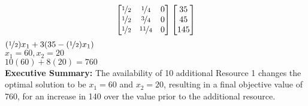 \documentclass[answers]{exam}
\begin{document}
\begin{questions}
\begin{solution}
\begin{parts}
		\[\begin{bmatrix}
			\nicefrac{1}{2} & \nicefrac{1}{4} & 0 \\
			\nicefrac{1}{2} & \nicefrac{3}{4} & 0 \\
			\nicefrac{1}{2} & \nicefrac{11}{4} & 0 \\
		\end{bmatrix}\begin{bmatrix}
			35 \\ 45 \\ 145 
		\end{bmatrix}\]
		\((\nicefrac{1}{2})x_1+3(35-(\nicefrac{1}{2})x_1)\) \\
		\(x_1 = 60, x_2 = 20\) \\
		\(10(60)+8(20)=760\) \bigskip \\
		\textbf{Executive Summary: }
		The availability of 10 additional Resource 1 changes the optimal solution to be \(x_1=60\) and \(x_2=20\), resulting in a final objective value of 760, for an increase in 140 over the value prior to the additional resource.
		
		

\end{parts}
\end{solution}
\end{questions}
\end{document}
